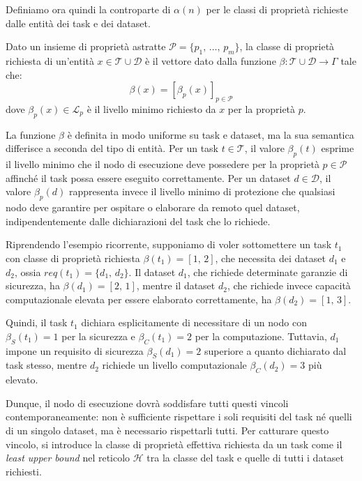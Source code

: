 Definiamo ora quindi la controparte di $\alpha(n)$ per le classi di proprietà richieste dalle entità dei task e dei dataset.

\begin{definition}
    \label{def:classe_richiesta}
    Dato un insieme di proprietà astratte $\mathcal{P} = \{p_1,\, \ldots,\, p_m\}$, la classe di proprietà richiesta di un'entità $x \in \mathcal{T} \cup \mathcal{D}$ è il vettore dato dalla funzione $\beta : \mathcal{T} \cup \mathcal{D} \rightarrow \Gamma$ tale che:
    \begin{equation}
        \beta(x) = \left[ \beta_p(x) \right]_{p \in \mathcal{P}}
    \end{equation}
    dove $\beta_p(x) \in \mathcal{L}_p$ è il livello minimo richiesto da $x$ per la proprietà $p$.
\end{definition}

La funzione $\beta$ è definita in modo uniforme su task e dataset, ma la sua semantica differisce a seconda del tipo di entità. Per un task $t \in \mathcal{T}$, il valore $\beta_p(t)$ esprime il livello minimo che il nodo di esecuzione deve possedere per la proprietà $p \in \mathcal{P}$ affinché il task possa essere eseguito correttamente. Per un dataset $d \in \mathcal{D}$, il valore $\beta_p(d)$ rappresenta invece il livello minimo di protezione che qualsiasi nodo deve garantire per ospitare o elaborare da remoto quel dataset, indipendentemente dalle dichiarazioni del task che lo richiede.

Riprendendo l'esempio ricorrente, supponiamo di voler sottomettere un task $t_1$ con classe di proprietà richiesta $\beta(t_1) = [1,\, 2]$, che necessita dei dataset $d_1$ e $d_2$, ossia $req(t_1) = \{d_1,\, d_2\}$. Il dataset $d_1$, che richiede determinate garanzie di sicurezza, ha $\beta(d_1) = [2,\, 1]$, mentre il dataset $d_2$, che richiede invece capacità computazionale elevata per essere elaborato correttamente, ha $\beta(d_2) = [1,\, 3]$.

Quindi, il task $t_1$ dichiara esplicitamente di necessitare di un nodo con $\beta_S(t_1) = 1$ per la sicurezza e $\beta_C(t_1) = 2$ per la computazione. Tuttavia, $d_1$ impone un requisito di sicurezza $\beta_S(d_1) = 2$ superiore a quanto dichiarato dal task stesso, mentre $d_2$ richiede un livello computazionale $\beta_C(d_2) = 3$ più elevato.

Dunque, il nodo di esecuzione dovrà soddisfare tutti questi vincoli contemporaneamente: non è sufficiente rispettare i soli requisiti del task né quelli di un singolo dataset, ma è necessario rispettarli tutti. Per catturare questo vincolo, si introduce la classe di proprietà effettiva richiesta da un task come il \emph{least upper bound} nel reticolo $\mathcal{H}$ tra la classe del task e quelle di tutti i dataset richiesti.

